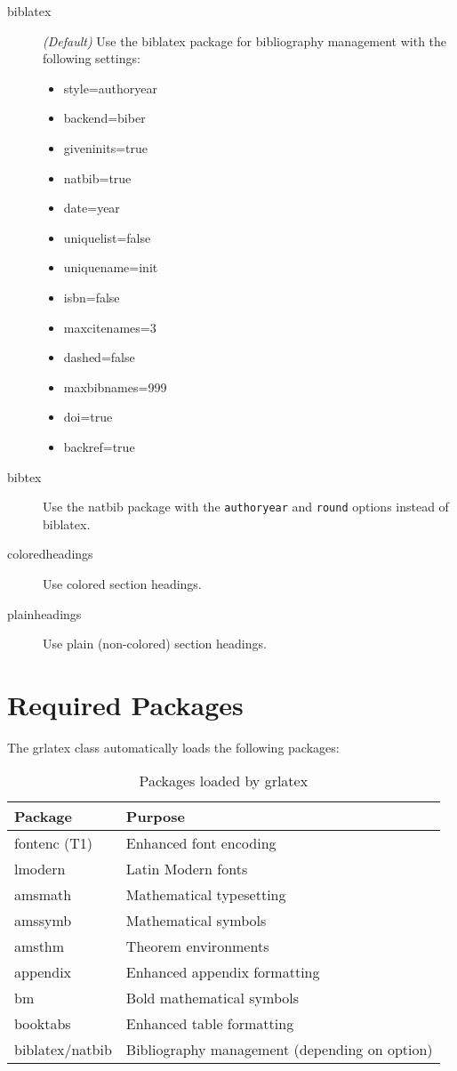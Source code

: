 \documentclass{ltxdoc}
\begin{document}
\begin{description}
\item[biblatex] \emph{(Default)} Use the \textsf{biblatex} package for bibliography management with the following settings:
  \begin{itemize}
    \item style=authoryear
    \item backend=biber
    \item giveninits=true
    \item natbib=true
    \item date=year
    \item uniquelist=false
    \item uniquename=init
    \item isbn=false
    \item maxcitenames=3
    \item dashed=false
    \item maxbibnames=999
    \item doi=true
    \item backref=true
  \end{itemize}

\item[bibtex] Use the \textsf{natbib} package with the \texttt{authoryear} and \texttt{round} options instead of \textsf{biblatex}.

\item[coloredheadings] Use colored section headings.

\item[plainheadings] Use plain (non-colored) section headings.
\end{description}

\section{Required Packages}

The \textsf{grlatex} class automatically loads the following packages:

\begin{table}[ht]
\centering
\begin{tabular}{ll}
\toprule
\textbf{Package} & \textbf{Purpose} \\
\midrule
fontenc (T1) & Enhanced font encoding \\
lmodern & Latin Modern fonts \\
amsmath & Mathematical typesetting \\
amssymb & Mathematical symbols \\
amsthm & Theorem environments \\
appendix & Enhanced appendix formatting \\
bm & Bold mathematical symbols \\
booktabs & Enhanced table formatting \\
biblatex/natbib & Bibliography management (depending on option) \\
\bottomrule
\end{tabular}
\caption{Packages loaded by \textsf{grlatex}}
\end{table}
\end{document}
